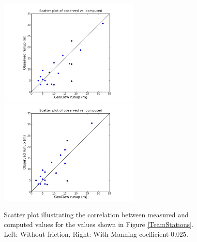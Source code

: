 
\begin{figure}[ht]
\hfil\includegraphics[width=2.8in]{bp9/scatter.png}\hfil
\hfil\includegraphics[width=2.8in]{bp9/scatter_friction.png}\hfil
\caption{\label{bp9scatter}
Scatter plot illustrating the correlation between measured and computed
values for the values shown in Figure \ref{TeamStations}.
Left: Without friction, Right: With Manning coefficient 0.025.
  }
\end{figure}

% 

